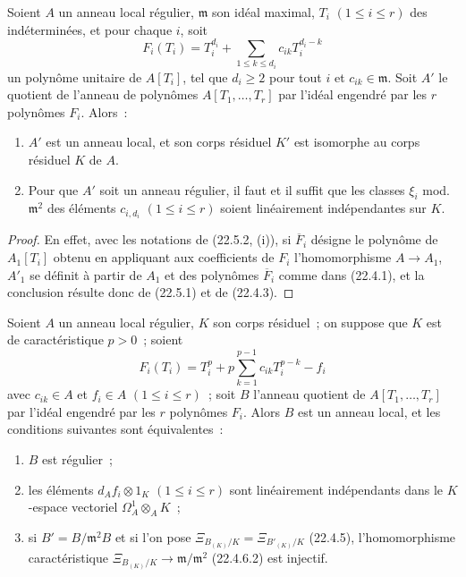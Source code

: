 \begin{corollary}[22.5.3]
\label{0.22.5.3-fr}
Soient $A$ un anneau local régulier, $\mathfrak m$ son idéal maximal,
$T_i$ $(1\leqslant i\leqslant r)$ des indéterminées, et pour chaque $i$, soit
\begin{equation}
\label{0.22.5.3.1-fr}
  F_i(T_i)=T_i^{d_i}+\sum_{1\leqslant k\leqslant d_i}c_{ik}T_i^{d_i-k}
  \tag{22.5.3.1}
\end{equation}
un polynôme unitaire de $A[T_i]$, tel que $d_i\geqslant2$ pour tout $i$ et
$c_{ik}\in\mathfrak m$. Soit $A'$ le quotient de l'anneau de polynômes
$A[T_1,\ldots,T_r]$ par l'idéal engendré par les $r$ polynômes $F_i$. Alors~:
\begin{enumerate}
  \item[\rm(i)] $A'$ est un anneau local, et son corps résiduel $K'$ est
  isomorphe au corps résiduel $K$ de $A$.
  \item[\rm(ii)] Pour que $A'$ soit un anneau régulier, il faut et il suffit
  que les classes $\xi_i$ mod.~$\mathfrak m^2$ des éléments $c_{i,d_i}$
  $(1\leqslant i\leqslant r)$ soient linéairement indépendantes sur $K$.
\end{enumerate}
\end{corollary}

\begin{proof}
En effet, avec les notations de (22.5.2, (i)), si $\overline F_i$ désigne le
polynôme de $A_1[T_i]$ obtenu en appliquant aux coefficients de $F_i$
l'homomorphisme $A\longrightarrow A_1$, $A'_1$ se définit à partir de $A_1$ et
des polynômes $\overline F_i$ comme dans (22.4.1), et la conclusion résulte
donc de (22.5.1) et de (22.4.3).
\end{proof}

\begin{theorem}[22.5.4]
\label{0.22.5.4-fr}
Soient $A$ un anneau local régulier, $K$ son corps résiduel~; on suppose que
$K$ est de caractéristique $p>0$~; soient
\begin{equation}
\label{0.22.5.4.1-fr}
  F_i(T_i)=T_i^p+p\sum_{k=1}^{p-1}c_{ik}T_i^{p-k}-f_i
  \tag{22.5.4.1}
\end{equation}
avec $c_{ik}\in A$ et $f_i\in A$ $(1\leqslant i\leqslant r)$~; soit $B$
l'anneau quotient de $A[T_1,\ldots,T_r]$ par l'idéal engendré par les $r$
polynômes $F_i$. Alors $B$ est un anneau local, et les conditions suivantes
sont équivalentes~:
\begin{enumerate}
  \item[a)] $B$ est régulier~;
  \item[b)] les éléments $d_Af_i\otimes1_K$ $(1\leqslant i\leqslant r)$ sont
  linéairement indépendants dans le $K$-espace vectoriel
  $\Omega^1_A\otimes_AK$~;
  \item[c)] si $B'=B/\mathfrak m^2B$ et si l'on pose
  $\Xi_{B_{(K)}/K}=\Xi_{B'_{(K)}/K}$ (22.4.5), l'homomorphisme
  caractéristique $\Xi_{B_{(K)}/K}\longrightarrow\mathfrak m/\mathfrak m^2$
  (22.4.6.2) est injectif.
\end{enumerate}
\end{theorem}

